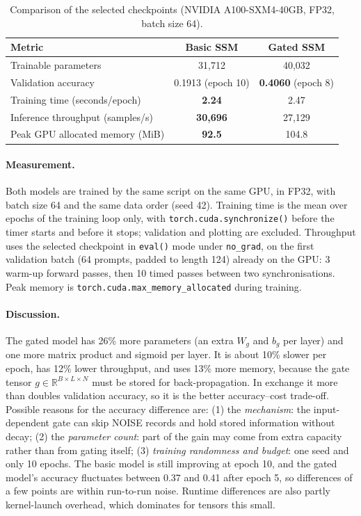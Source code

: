 \documentclass[11pt,a4paper]{article}
\begin{document}
\begin{table}[H]
    \centering
    \caption{Comparison of the selected checkpoints (NVIDIA
    A100-SXM4-40GB, FP32, batch size 64).}
    \label{tab:p1-cost}
    \begin{tabular}{lcc}
        \toprule
        Metric & Basic SSM & Gated SSM\\
        \midrule
        Trainable parameters & 31,712 & 40,032\\
        Validation accuracy & 0.1913 (epoch 10) & \textbf{0.4060} (epoch 8)\\
        Training time (seconds/epoch) & \textbf{2.24} & 2.47\\
        Inference throughput (samples/s) & \textbf{30,696} & 27,129\\
        Peak GPU allocated memory (MiB) & \textbf{92.5} & 104.8\\
        \bottomrule
    \end{tabular}
\end{table}

\paragraph{Measurement.}
Both models are trained by the same script on the same GPU, in FP32,
with batch size 64 and the same data order (seed 42). Training time is
the mean over epochs of the training loop only, with
\texttt{torch.cuda.synchronize()} before the timer starts and before it
stops; validation and plotting are excluded. Throughput uses the
selected checkpoint in \texttt{eval()} mode under \texttt{no\_grad}, on
the first validation batch (64 prompts, padded to length 124) already on
the GPU: 3 warm-up forward passes, then 10 timed passes between two
synchronisations. Peak memory is \texttt{torch.cuda.max\_memory\_allocated}
during training.

\paragraph{Discussion.}
The gated model has 26\% more parameters (an extra $W_g$ and $b_g$ per
layer) and one more matrix product and sigmoid per layer. It is about
10\% slower per epoch, has 12\% lower throughput, and uses 13\% more
memory, because the gate tensor $g\in\mathbb{R}^{B\times L\times N}$
must be stored for back-propagation. In exchange it more than doubles
validation accuracy, so it is the better accuracy--cost trade-off.
Possible reasons for the accuracy difference are:
(1) the \emph{mechanism}: the input-dependent gate can skip NOISE
records and hold stored information without decay;
(2) the \emph{parameter count}: part of the gain may come from extra
capacity rather than from gating itself;
(3) \emph{training randomness and budget}: one seed and only 10 epochs.
The basic model is still improving at epoch 10, and the gated model's
accuracy fluctuates between 0.37 and 0.41 after epoch 5, so differences
of a few points are within run-to-run noise. Runtime differences are
also partly kernel-launch overhead, which dominates for tensors this
small.
\end{document}
